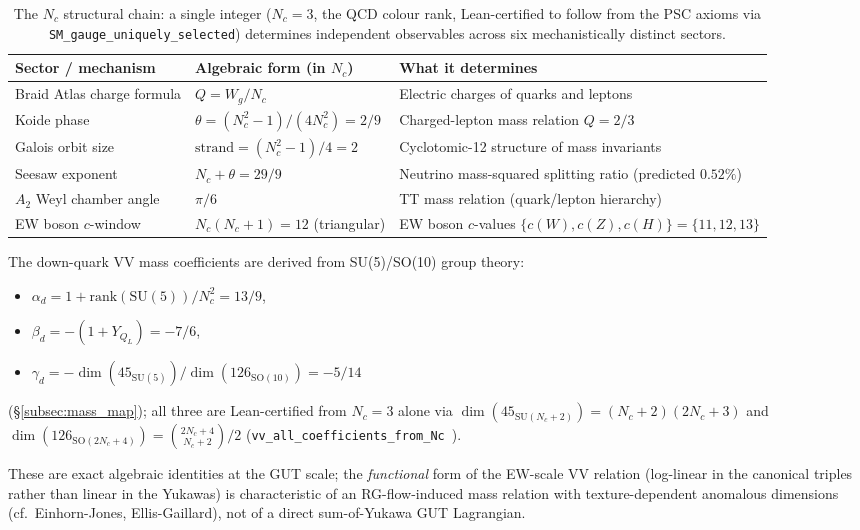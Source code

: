 \documentclass[11pt]{article}
\theoremstyle{remark}
\begin{document}
\begin{table}[ht]
\centering
\caption{The $N_c$ structural chain: a single integer ($N_c = 3$, the QCD colour rank, Lean-certified to follow from the PSC axioms via \texttt{SM\_gauge\_uniquely\_selected}) determines independent observables across six mechanistically distinct sectors.}
\label{tab:nc_chain}
\small
\renewcommand{\arraystretch}{1.20}
\begin{tabular}{@{}p{3.6cm} l p{6.0cm}@{}}
\toprule
\textbf{Sector / mechanism} & \textbf{Algebraic form (in $N_c$)} & \textbf{What it determines} \\
\midrule
Braid Atlas charge formula & $Q = W_g/N_c$ & Electric charges of quarks and leptons \\
Koide phase & $\theta = (N_c^2-1)/(4N_c^2) = 2/9$ & Charged-lepton mass relation $Q=2/3$ \\
Galois orbit size & $\mathrm{strand} = (N_c^2-1)/4 = 2$ & Cyclotomic-12 structure of mass invariants \\
Seesaw exponent & $N_c + \theta = 29/9$ & Neutrino mass-squared splitting ratio (predicted $0.52\%$) \\
$A_2$ Weyl chamber angle & $\pi/6$ & TT mass relation (quark/lepton hierarchy) \\
EW boson $c$-window & $N_c(N_c+1) = 12$ (triangular) & EW boson $c$-values $\{c(W),c(Z),c(H)\} = \{11,12,13\}$ \\
\bottomrule
\end{tabular}
\end{table}

\smallskip
The down-quark VV mass coefficients are derived from SU(5)/SO(10) group theory:
\begin{itemize}[leftmargin=1.5em,itemsep=0.1em,topsep=0.2em]
  \item $\alpha_d = 1 + \mathrm{rank}(\mathrm{SU}(5))/N_c^2 = 13/9$,
  \item $\beta_d = -(1+Y_{Q_L}) = -7/6$,
  \item $\gamma_d = -\dim(45_{\mathrm{SU}(5)})/\dim(126_{\mathrm{SO}(10)}) = -5/14$
\end{itemize}
(\S\ref{subsec:mass_map}); all three are Lean-certified from $N_c = 3$ alone via $\dim(45_{\mathrm{SU}(N_c+2)}) = (N_c{+}2)(2N_c{+}3)$ and $\dim(126_{\mathrm{SO}(2N_c+4)}) = \binom{2N_c+4}{N_c+2}/2$ (\texttt{vv\_all\_coefficients\_from\_Nc}~\cite{ugp-lean}).

\smallskip
These are exact algebraic identities at the GUT scale; the \emph{functional} form of the EW-scale VV relation (log-linear in the canonical triples rather than linear in the Yukawas) is characteristic of an RG-flow-induced mass relation with texture-dependent anomalous dimensions (cf.\ Einhorn-Jones, Ellis-Gaillard), not of a direct sum-of-Yukawa GUT Lagrangian.
\end{document}
